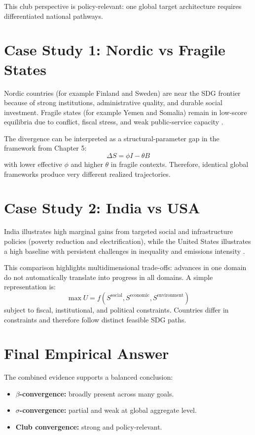 This club perspective is policy-relevant: one global target architecture requires differentiated national pathways.

\chapter{Case Study 1: Nordic vs Fragile States}
Nordic countries (for example Finland and Sweden) are near the SDG frontier because of strong institutions, administrative quality, and durable social investment. Fragile states (for example Yemen and Somalia) remain in low-score equilibria due to conflict, fiscal stress, and weak public-service capacity \citep{sachs2025}.

The divergence can be interpreted as a structural-parameter gap in the framework from Chapter 5:
\[
\Delta S = \phi I - \theta B
\]
with lower effective $\phi$ and higher $\theta$ in fragile contexts. Therefore, identical global frameworks produce very different realized trajectories.

\chapter{Case Study 2: India vs USA}
India illustrates high marginal gains from targeted social and infrastructure policies (poverty reduction and electrification), while the United States illustrates a high baseline with persistent challenges in inequality and emissions intensity \citep{sdsn2022,sachs2025}.

This comparison highlights multidimensional trade-offs: advances in one domain do not automatically translate into progress in all domains. A simple representation is:
\[
\max U = f(S^{\text{social}}, S^{\text{economic}}, S^{\text{environment}})
\]
subject to fiscal, institutional, and political constraints. Countries differ in constraints and therefore follow distinct feasible SDG paths.

\chapter{Final Empirical Answer}
The combined evidence supports a balanced conclusion:
\begin{itemize}
    \item \textbf{$\beta$-convergence:} broadly present across many goals.
    \item \textbf{$\sigma$-convergence:} partial and weak at global aggregate level.
    \item \textbf{Club convergence:} strong and policy-relevant.
\end{itemize}

